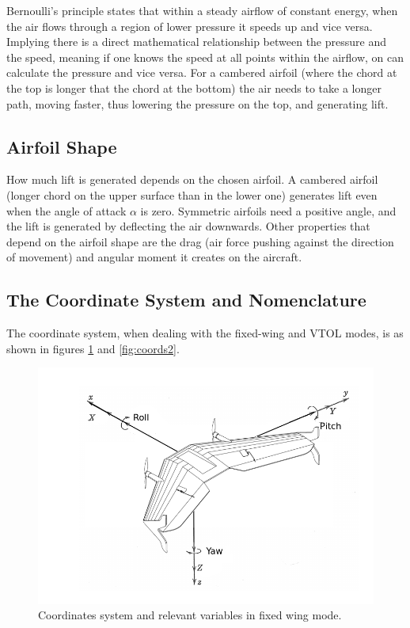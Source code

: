 Bernoulli's principle states that within a steady airflow of constant energy, when the air flows through a region of lower pressure it speeds up and vice versa. Implying there is a direct mathematical relationship between the pressure and the speed, meaning if one knows the speed at all points within the airflow, on can calculate the pressure and vice versa. For a cambered airfoil (where the chord at the top is longer that the chord at the bottom) the air needs to take a longer path, moving faster, thus lowering the pressure on the top, and generating lift.


\subsection{Airfoil Shape}
How much lift is generated depends on the chosen airfoil.
%
A cambered airfoil (longer chord on the upper surface than in the lower one) generates lift even when the angle of attack $\alpha$ is zero.
Symmetric airfoils need a positive angle, and the lift is generated by deflecting the air downwards.
Other properties that depend on the airfoil shape are the drag (air force pushing against the direction of movement) and angular moment it creates on the aircraft. 

\subsection{The Coordinate System and Nomenclature}

The coordinate system, when dealing with the fixed-wing and VTOL modes, is as shown in figures \ref{fig:coords1} and \ref{fig:coords2}.

\begin{figure}[h]
\centering
  \includegraphics[width=0.8\linewidth]{figs/axisfixedwing.png}
  \caption{Coordinates system and relevant variables in fixed wing mode.}
  \label{fig:coords1}
\end{figure}


